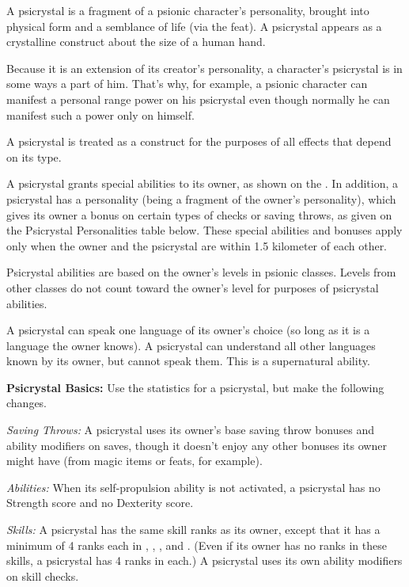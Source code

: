 A psicrystal is a fragment of a psionic character's personality, brought into physical form and a semblance of life (via the  feat). A psicrystal appears as a crystalline construct about the size of a human hand.

Because it is an extension of its creator's personality, a character's psicrystal is in some ways a part of him. That's why, for example, a psionic character can manifest a personal range power on his psicrystal even though normally he can manifest such a power only on himself.

A psicrystal is treated as a construct for the purposes of all effects that depend on its type.

A psicrystal grants special abilities to its owner, as shown on the . In addition, a psicrystal has a personality (being a fragment of the owner's personality), which gives its owner a bonus on certain types of checks or saving throws, as given on the Psicrystal Personalities table below. These special abilities and bonuses apply only when the owner and the psicrystal are within 1.5 kilometer of each other.

Psicrystal abilities are based on the owner's levels in psionic classes. Levels from other classes do not count toward the owner's level for purposes of psicrystal abilities.

A psicrystal can speak one language of its owner's choice (so long as it is a language the owner knows). A psicrystal can understand all other languages known by its owner, but cannot speak them. This is a supernatural ability.

\textbf{Psicrystal Basics:} Use the statistics for a psicrystal, but make the following changes.

\textit{Saving Throws:} A psicrystal uses its owner's base saving throw bonuses and ability modifiers on saves, though it doesn't enjoy any other bonuses its owner might have (from magic items or feats, for example).

\textit{Abilities:} When its self-propulsion ability is not activated, a psicrystal has no Strength score and no Dexterity score.

\textit{Skills:} A psicrystal has the same skill ranks as its owner, except that it has a minimum of 4 ranks each in , , , and . (Even if its owner has no ranks in these skills, a psicrystal has 4 ranks in each.) A psicrystal uses its own ability modifiers on skill checks.

